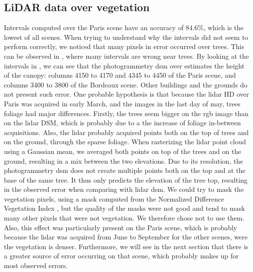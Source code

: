 \subsection{LiDAR data over vegetation}\label{eq:lidar_vegetation}
Intervals computed over the Paris scene have an accuracy of $84.6\%$, which is the lowest of all scenes. When trying to understand why the intervals did not seem to perform correctly, we noticed that many pixels in error occurred over trees. This can be observed in , where many intervals are wrong near trees. By looking at the intervals in , we can see that the photogrammetry \acrshort{dsm} over estimates the height of the canopy: columns 4150 to 4170 and 4345 to 4450 of the Paris scene, and columns 3400 to 3800 of the Bordeaux scene. Other buildings and the grounds do not present such error. One probable hypothesis is that because the \acrshort{lidar} HD over Paris was acquired in early March, and the images in the last day of may, trees foliage had major differences. Firstly, the trees seem bigger on the \acrshort{rgb} image than on the \acrshort{lidar} DSM, which is probably due to a the increase of foliage in-between acquisitions. Also, the \acrshort{lidar} probably acquired points both on the top of trees and on the ground, through the sparse foliage. When rasterizing the \acrshort{lidar} point cloud using a Gaussian mean, we averaged both points on top of the trees and on the ground, resulting in a mix between the two elevations. Due to its resolution, the photogrammetry \acrshort{dsm} does not create multiple points both on the top and at the base of the same tree. It thus only predicts the elevation of the tree top, resulting in the observed error when comparing with \acrshort{lidar} \acrshort{dsm}. We could try to mask the vegetation pixels, using a mask computed from the Normalized Difference Vegetation Index \cite{gao_ndwinormalized_1996}, but the quality of the masks were not good and tend to mask many other pixels that were not vegetation. We therefore chose not to use them. Also, this effect was particularly present on the Paris scene, which is probably because the \acrshort{lidar} was acquired from June to September for the other scenes, were the vegetation is denser. Furthermore, we will see in the next section that there is a greater source of error occurring on that scene, which probably makes up for most observed errors. 

